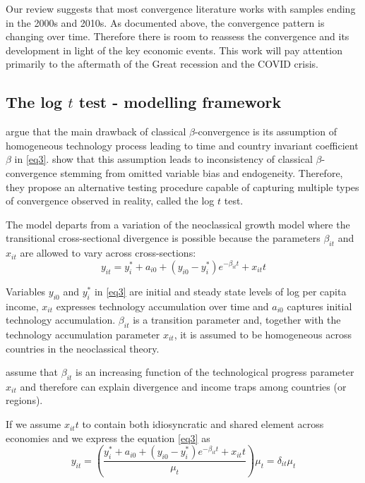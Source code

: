 \documentclass[11pt]{article}
\begin{document}
Our review suggests that most convergence literature works with samples ending in the 2000s and 2010s. As documented above, the convergence pattern is changing over time. Therefore there is room to reassess the convergence and its development in light of the key economic events. This work will pay attention primarily to the aftermath of the Great recession and the COVID crisis.


\subsection{The log $t$ test - modelling framework}
\citet{phillips2007transition} argue that the main drawback of classical $\beta$-convergence is its assumption of homogeneous technology process leading to time and country invariant coefficient $\beta$ in \eqref{eq3}. \citet{phillips2007transition} show that this assumption leads to inconsistency of classical $\beta$-convergence stemming from omitted variable bias and endogeneity. Therefore, they propose an alternative testing procedure capable of capturing multiple types of convergence observed in reality, called the log $t$ test.


The model departs from a variation of the neoclassical growth model where the transitional cross-sectional divergence is possible because the parameters $\beta_{it}$ and $x_{it}$ are allowed to vary across cross-sections:
\begin{equation} \label{eq3}
 y_{it} = y_i^* + a_{i0} + (y_{i0} - y_i^*)e^{-\beta_{it}t} + x_{it}t 
\end{equation}

 Variables $y_{i0}$ and $y_{i}^{*}$ in \eqref{eq3} are initial and steady state levels of log per capita income, $x_{it}$ expresses technology accumulation over time and $a_{i0}$ captures initial technology accumulation. $\beta_{it}$ is a transition parameter and, together with the technology accumulation parameter $x_{it}$, it is assumed to be homogeneous across countries in the neoclassical theory.

\citeauthor{phillips2007transition} assume that $\beta_{it}$ is an increasing function of the technological progress parameter $x_{it}$ and therefore can explain divergence and income traps among countries (or regions).

If we assume $x_{it}t$ to contain both idiosyncratic and shared element across economies and we express the equation \eqref{eq3} as
\begin{equation} \label{eq4} y_{it} = (\frac{ y_i^* + a_{i0} + (y_{i0} - y_i^*)e^{-\beta_{it}t} + x_{it}t}{\mu_t})\mu_t = \delta_{it}\mu_t  \end{equation}
\end{document}

